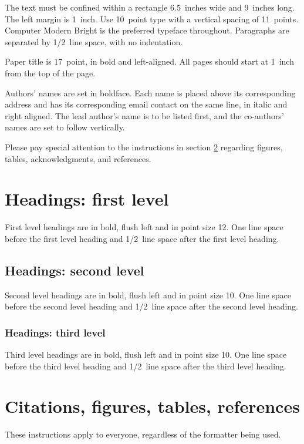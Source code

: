 \documentclass[10pt]{article} %
\begin{document}
The text must be confined within a rectangle 6.5~inches wide and
9~inches long. The left margin is 1~inch.
Use 10~point type with a vertical spacing of 11~points. Computer Modern Bright is the
preferred typeface throughout. Paragraphs are separated by 1/2~line space,
with no indentation.

Paper title is 17~point, in bold and left-aligned.
All pages should start at 1~inch from the top of the page.

Authors' names are
set in boldface. Each name is placed above its corresponding
address and has its corresponding email contact on the same line, in italic 
and right aligned. The lead author's name is to be listed first, and
the co-authors' names are set to follow vertically.

Please pay special attention to the instructions in section \ref{others}
regarding figures, tables, acknowledgments, and references.

\section{Headings: first level}
\label{headings}

First level headings are in bold,
flush left and in point size 12. One line space before the first level
heading and 1/2~line space after the first level heading.

\subsection{Headings: second level}

Second level headings are in bold,
flush left and in point size 10. One line space before the second level
heading and 1/2~line space after the second level heading.

\subsubsection{Headings: third level}

Third level headings are in bold,
flush left and in point size 10. One line space before the third level
heading and 1/2~line space after the third level heading.

\section{Citations, figures, tables, references}
\label{others}

These instructions apply to everyone, regardless of the formatter being used.
\end{document}
